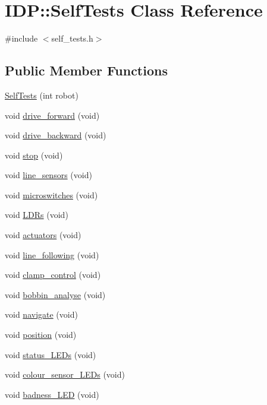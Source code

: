 \hypertarget{classIDP_1_1SelfTests}{
\section{IDP::SelfTests Class Reference}
\label{classIDP_1_1SelfTests}
}


{\ttfamily \#include $<$self\_\-tests.h$>$}

\subsection*{Public Member Functions}
\begin{DoxyCompactItemize}
\item 
\hyperlink{classIDP_1_1SelfTests_a6864b03502cc5d1ac3728b456b04238f}{SelfTests} (int robot)
\item 
void \hyperlink{classIDP_1_1SelfTests_a4ff456e74d55e13599cf64db76bd2ed4}{drive\_\-forward} (void)
\item 
void \hyperlink{classIDP_1_1SelfTests_a38ddef7ecdf9b7dfa69d689c9c1ac8ca}{drive\_\-backward} (void)
\item 
void \hyperlink{classIDP_1_1SelfTests_a33adf462d8c408b1c7b4858e9a4ff000}{stop} (void)
\item 
void \hyperlink{classIDP_1_1SelfTests_aa73ad4de6c1d2b725ed796c10f54ab7c}{line\_\-sensors} (void)
\item 
void \hyperlink{classIDP_1_1SelfTests_a6b2e4d0517de4b73c63f1b1a475b602f}{microswitches} (void)
\item 
void \hyperlink{classIDP_1_1SelfTests_a56952650637691f869ef21f7d43f1226}{LDRs} (void)
\item 
void \hyperlink{classIDP_1_1SelfTests_a0ca765ac144fafaab502f4326a480486}{actuators} (void)
\item 
void \hyperlink{classIDP_1_1SelfTests_a0a1a40b56fee5249def567bebdb05dc1}{line\_\-following} (void)
\item 
void \hyperlink{classIDP_1_1SelfTests_a896204355ca039660a12e8131578b6c3}{clamp\_\-control} (void)
\item 
void \hyperlink{classIDP_1_1SelfTests_a66f0a3bad277e36b963b2bf3cd5df9dd}{bobbin\_\-analyse} (void)
\item 
void \hyperlink{classIDP_1_1SelfTests_a710347081427c05706f92bdd12f62fbe}{navigate} (void)
\item 
void \hyperlink{classIDP_1_1SelfTests_ada3dfe991573fc6b0922cace927fc4e0}{position} (void)
\item 
void \hyperlink{classIDP_1_1SelfTests_abbe6e3e29b00f760e0b65f2aeb772fb5}{status\_\-LEDs} (void)
\item 
void \hyperlink{classIDP_1_1SelfTests_a1380b0222eef47f6d50e7cf334e4c9e7}{colour\_\-sensor\_\-LEDs} (void)
\item 
void \hyperlink{classIDP_1_1SelfTests_aee90c71e9e93398f06dc1ad67002d7bf}{badness\_\-LED} (void)
\end{DoxyCompactItemize}


